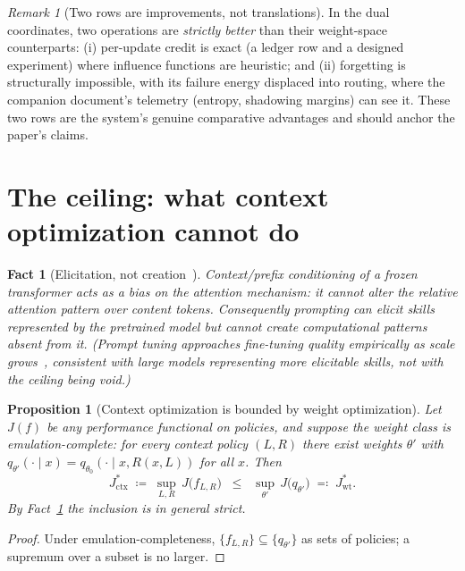 \documentclass[11pt]{article}
\theoremstyle{plain}
\newtheorem{proposition}[theorem]{Proposition}
\newtheorem{fact}[theorem]{Fact}            %
\theoremstyle{definition}
\theoremstyle{remark}
\newtheorem{remark}[theorem]{Remark}
\begin{document}
\begin{remark}[Two rows are improvements, not translations]
In the dual coordinates, two operations are \emph{strictly better} than
their weight-space counterparts: (i) per-update credit is exact (a ledger
row and a designed experiment) where influence functions are heuristic; and
(ii) forgetting is structurally impossible, with its failure energy
displaced into routing, where the companion document's telemetry
(entropy, shadowing margins) can see it. These two rows are the system's
genuine comparative advantages and should anchor the paper's claims.
\end{remark}

\section{The ceiling: what context optimization cannot do}\label{sec:ceiling}

\begin{fact}[Elicitation, not creation~\cite{petrov}]\label{fact:petrov}
Context/prefix conditioning of a frozen transformer acts as a bias on the
attention mechanism: it cannot alter the relative attention pattern over
content tokens. Consequently prompting can \emph{elicit} skills represented
by the pretrained model but cannot \emph{create} computational patterns
absent from it. (Prompt tuning approaches fine-tuning quality empirically as
scale grows~\cite{lester}, consistent with large models representing more
elicitable skills, not with the ceiling being void.)
\end{fact}

\begin{proposition}[Context optimization is bounded by weight
optimization]\label{prop:ceiling}
Let $J(f)$ be any performance functional on policies, and suppose the weight
class is \emph{emulation-complete}: for every context policy $(L, R)$ there
exist weights $\theta'$ with
$q_{\theta'}(\cdot \mid x) = q_{\theta_0}(\cdot \mid x, R(x, L))$ for all
$x$. Then
\[
  J^{\ast}_{\mathrm{ctx}}
  \;\coloneqq\; \sup_{L, R}\, J\bigl(f_{L,R}\bigr)
  \;\;\le\;\;
  \sup_{\theta'}\, J\bigl(q_{\theta'}\bigr)
  \;\eqqcolon\; J^{\ast}_{\mathrm{wt}} .
\]
By Fact~\ref{fact:petrov} the inclusion is in general strict.
\end{proposition}

\begin{proof}
Under emulation-completeness, $\{f_{L,R}\} \subseteq \{q_{\theta'}\}$ as
sets of policies; a supremum over a subset is no larger.
\end{proof}
\end{document}
